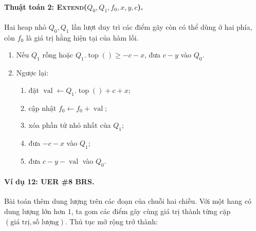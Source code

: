 \documentclass[11pt]{article}
\begin{document}
\paragraph{Thuật toán 2: \textsc{Extend}(\(Q_0,Q_1,f_0,x,y,c\)).}
Hai heap nhỏ \(Q_0,Q_1\) lần lượt duy trì các điểm gãy còn có thể dùng ở hai
phía, còn \(f_0\) là giá trị hằng hiện tại của hàm lồi.
\begin{enumerate}
  \item Nếu \(Q_1\) rỗng hoặc \(Q_1.\operatorname{top}()\ge -c-x\), đưa
  \(c-y\) vào \(Q_0\).
  \item Ngược lại:
  \begin{enumerate}
    \item đặt \(\operatorname{val}\leftarrow Q_1.\operatorname{top}()+c+x\);
    \item cập nhật \(f_0\leftarrow f_0+\operatorname{val}\);
    \item xóa phần tử nhỏ nhất của \(Q_1\);
    \item đưa \(-c-x\) vào \(Q_1\);
    \item đưa \(c-y-\operatorname{val}\) vào \(Q_0\).
  \end{enumerate}
\end{enumerate}

\paragraph{Ví dụ 12: UER \#8 BRS.}
Bài toán thêm dung lượng trên các đoạn của chuỗi hai chiều. Với một hang có
dung lượng lớn hơn \(1\), ta gom các điểm gãy cùng giá trị thành từng cặp
\((\text{giá trị},\text{số lượng})\). Thủ tục mở rộng trở thành:
\end{document}
